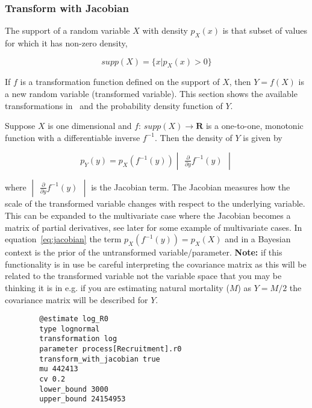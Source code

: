 \subsubsection*{Transform with Jacobian}

The support of a random variable $X$ with density $p_X(x)$ is that subset of values for which it has non-zero density,

\begin{equation}
  supp(X) = \{x|p_X(x) > 0\}
\end{equation}

If $f$ is a transformation function defined on the support of $X$, then $Y = f(X)$ is a new random variable (transformed variable). This section shows the available transformations in \CNAME\ and the probability density function of $Y$. %

Suppose $X$ is one dimensional and $f$: $supp(X) \to \mathbf{R}$ is a one-to-one, monotonic function with a differentiable inverse $f^{-1}$. Then the density of $Y$ is given by

\begin{equation}\label{eq:jacobian}
	p_Y(y) = p_X(f^{-1}(y)) \begin{vmatrix} \frac{\partial}{\partial y} f^{-1}(y) \end{vmatrix}
\end{equation}

where $\begin{vmatrix} \frac{\partial}{\partial y} f^{-1}(y) \end{vmatrix}$ is the Jacobian term. The Jacobian measures how the scale of the transformed variable changes with respect to the underlying variable. This can be expanded to the multivariate case where the Jacobian becomes a matrix of partial derivatives, see later for some example of multivariate cases. In equation~\ref{eq:jacobian} the term $p_X(f^{-1}(y)) = p_X(X)$ and in a Bayesian context is the prior of the untransformed variable/parameter. \textbf{Note:} if this functionality is in use be careful interpreting the covariance matrix as this will be related to the transformed variable not the variable space that you may be thinking it is in e.g. if you are estimating natural mortality ($M$) as $Y = M/2$ the covariance matrix will be described for $Y$.

{\small{\begin{verbatim}
		@estimate log_R0
		type lognormal
		transformation log
		parameter process[Recruitment].r0
		transform_with_jacobian true
		mu 442413
		cv 0.2
		lower_bound 3000
		upper_bound 24154953
\end{verbatim}}}

